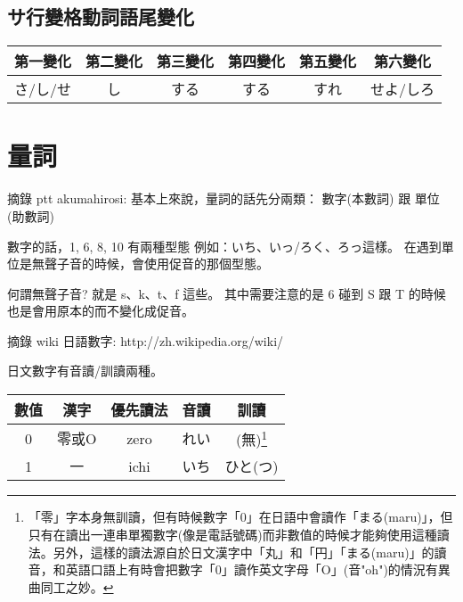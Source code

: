 \documentclass[12pt]{article}
\begin{document}
\begin{CJK}{UTF8}{cybercjk}
\subsection{サ行變格動詞語尾變化}
\begin{table}[htdp]
\begin{tabular}{cccccc}
第一變化 & 第二變化 & 第三變化 & 第四變化 & 第五變化 & 第六變化 \\
\hline
さ/し/せ & し & する & する & すれ& せよ/しろ \\
\end{tabular}
\end{table}

\section{量詞}

摘錄 ptt akumahirosi:
  基本上來說，量詞的話先分兩類： 數字(本數詞)  跟  單位(助數詞)

  數字的話，1, 6, 8, 10 有兩種型態
  例如：いち、いっ/ろく、ろっ這樣。
  在遇到單位是無聲子音的時候，會使用促音的那個型態。

  何謂無聲子音? 就是 s、k、t、f 這些。
  其中需要注意的是 6 碰到 S 跟 T 的時候也是會用原本的而不變化成促音。

摘錄 wiki 日語數字: http://zh.wikipedia.org/wiki/%

日文數字有音讀/訓讀兩種。

\begin{table}[htdp]
\begin{tabular}{ccccc}
數值 & 	漢字 &	優先讀法 & 音讀 & 訓讀\\
\hline
\begin{comment}
\end{comment}
0 &	零或O & zero &	れい &	(無)\footnote{「零」字本身無訓讀，但有時候數字「0」在日語中會讀作「まる(maru)」，但只有在讀出一連串單獨數字(像是電話號碼)而非數值的時候才能夠使用這種讀法。另外，這樣的讀法源自於日文漢字中「丸」和「円」「まる(maru)」的讀音，和英語口語上有時會把數字「0」讀作英文字母「O」(音"oh")的情況有異曲同工之妙。} \\
\hline
1 &	一 &	ichi &	いち  &	ひと(つ) \\
\end{tabular}
\end{table}



\end{CJK}
\end{document}
